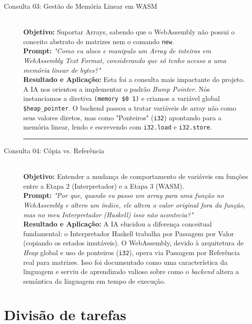 \documentclass[12pt,a4paper]{article}
\begin{document}
\begin{description}
    \item[Consulta 03: Gestão de Memória Linear em WASM] \hfill \\
    \textbf{Objetivo:} Suportar Arrays, sabendo que o WebAssembly não possui o conceito abstrato de matrizes nem o comando \texttt{new}.\\
    \textbf{Prompt:} \textit{"Como eu aloco e manipulo um Array de inteiros em WebAssembly Text Format, considerando que só tenho acesso a uma memória linear de bytes?"}\\
    \textbf{Resultado e Aplicação:} Esta foi a consulta mais impactante do projeto. A IA nos orientou a implementar o padrão \textit{Bump Pointer}. Nós instanciamos a diretiva \texttt{(memory \$0 1)} e criamos a variável global \texttt{\$heap\_pointer}. O backend passou a tratar variáveis de array não como seus valores diretos, mas como "Ponteiros" (\texttt{i32}) apontando para a memória linear, lendo e escrevendo com \texttt{i32.load} e \texttt{i32.store}.

    \vspace{0.5cm}
    \hrule
    \vspace{0.5cm}
    
    \item[Consulta 04: Cópia vs. Referência] \hfill \\
    \textbf{Objetivo:} Entender a mudança de comportamento de variáveis em funções entre a Etapa 2 (Interpretador) e a Etapa 3 (WASM).\\
    \textbf{Prompt:} \textit{"Por que, quando eu passo um array para uma função no WebAssembly e altero um índice, ele altera o valor original fora da função, mas no meu Interpretador (Haskell) isso não acontecia?"}\\
    \textbf{Resultado e Aplicação:} A IA elucidou a diferença conceitual fundamental: o Interpretador Haskell trabalha por Passagem por Valor (copiando os estados imutáveis). O WebAssembly, devido à arquitetura de \textit{Heap} global e uso de ponteiros (\texttt{i32}), opera via Passagem por Referência real para matrizes. Isso foi documentado como uma característica da linguagem e serviu de aprendizado valioso sobre como o \textit{backend} altera a semântica da linguagem em tempo de execução.
\end{description}

\section{Divisão de tarefas}
\end{document}
